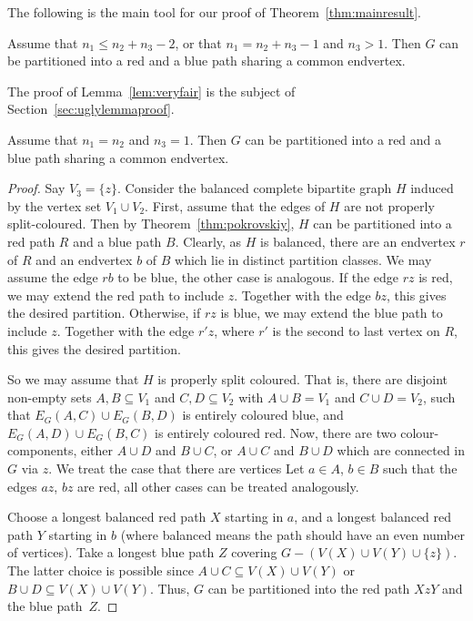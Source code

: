 \documentclass[a4paper,10pt]{article}
\begin{document}
The following is the main tool for our proof of Theorem~\ref{thm:mainresult}. 
\begin{lemma}\label{lem:veryfair}
Assume that $n_1 \le n_2 + n_3 - 2$, or that $n_1=n_2+n_3-1$ and $n_3>1$.
Then $G$ can be partitioned into a red and a blue path sharing a common endvertex.
\end{lemma}

The proof of Lemma~\ref{lem:veryfair} is the subject of Section~\ref{sec:uglylemmaproof}.

\begin{lemma}\label{lem:notsofair}
Assume that $n_1 = n_{2}$ and $ n_3 = 1$.
Then $G$ can be partitioned into a red and a blue path sharing a common endvertex.
\end{lemma}
\begin{proof}
Say $V_3 = \{z\}$.
Consider the balanced complete bipartite graph $H$ induced by the vertex set $V_1 \cup V_2$. First, assume that the edges of $H$ are not properly split-coloured. Then
by Theorem~\ref{thm:pokrovskiy}, $H$ can be partitioned into a red path $R$ and a blue path $B$.
Clearly, as $H$ is balanced, there are an endvertex $r$ of $R$ and an endvertex $b$ of $B$ which lie in distinct partition classes.
We may assume the edge $rb$ to be blue, the other case is analogous.
If the edge $rz$ is red, we may extend the red path to include $z$. Together with the edge $bz$, this gives the desired partition.
Otherwise, if $rz$ is blue, we may extend the blue path to include $z$. Together with the edge $r'z$, where $r'$ is the second to last vertex on $R$,  this gives the desired partition.

So we may assume that $H$ is properly split coloured. 
That is, there are disjoint non-empty sets $A,B \subseteq V_1$ and $C,D \subseteq V_2$ with $A \cup B = V_1$ and $C \cup D = V_2$, such that $E_G(A,C) \cup E_G(B,D)$ is entirely coloured blue, and $E_G(A,D) \cup E_G(B,C)$ is entirely coloured red. Now, there are two colour-components, either $A\cup D$ and $B\cup C$, or $A\cup C$ and $B\cup D$ which are connected in $G$ via $z$. We treat the case that there are vertices 
Let $a \in A$, $b \in B$ such that the edges $az$, $bz$ are red, all other cases can be treated analogously.

Choose a longest balanced red path $X$ starting in $a$, and a longest balanced red path $Y$ starting in $b$ (where balanced means the path should have an even number of vertices). Take a longest blue path $Z$ covering $G-(V(X)\cup V(Y) \cup \{z\})$.
The latter choice is possible since $A \cup C \subseteq V(X)\cup V(Y)$ or $B \cup D \subseteq V(X)\cup V(Y)$.
Thus, $G$ can be partitioned into the red path $XzY$ and the blue path~$Z$.
\end{proof}
\end{document}
